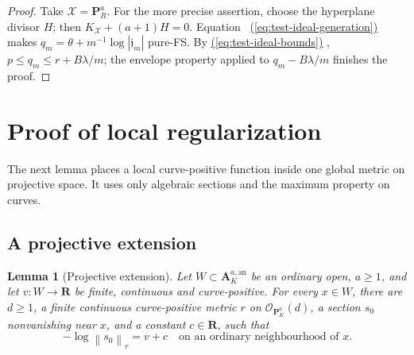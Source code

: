 \documentclass[11pt]{amsart}
\newtheorem{lemma}[theorem]{Lemma}
\theoremstyle{definition}
\theoremstyle{remark}
\numberwithin{equation}{section}
\newcommand{\an}{\mathrm{an}}
\newcommand{\PP}{\mathbf P}
\newcommand{\Aff}{\mathbf A}
\newcommand{\OO}{\mathcal O}
\newcommand{\cX}{\mathscr X}
\newcommand{\norm}[1]{\left\lVert#1\right\rVert}
\renewcommand{\eqref}[1]{%
 \begingroup\hypersetup{linkcolor=equationviolet}%
 \hyperref[#1]{\textup{(\ref*{#1})}}%
 \endgroup}
\begin{document}
\begin{proof}
Take \(\cX=\PP^a_R\).
For the more precise assertion, choose the hyperplane divisor \(H\);
then \(K_{\cX}+(a+1)H=0\).
Equation~\eqref{eq:test-ideal-generation} makes
\(q_m=\theta+m^{-1}\log|\mathfrak j_m|\) pure-FS.
By \eqref{eq:test-ideal-bounds}, \(p\le q_m\le r+B\lambda/m\);
the envelope property applied to \(q_m-B\lambda/m\) finishes the proof.
\end{proof}

\section{Proof of local regularization}\label{sec:local-proof}
The next lemma places a local curve-positive function inside one
global metric on projective space. It uses only algebraic sections
and the maximum property on curves.

\subsection{A projective extension}\label{subsec:projective-extension}

\begin{lemma}[Projective extension]\label{lem:projective-extension}
Let \(W\subset\Aff_K^{a,\an}\) be an ordinary open, \(a\ge1\),
and let \(v:W\to\mathbf R\) be finite, continuous and curve-positive.
For every \(x\in W\), there are \(d\ge1\), a finite continuous
curve-positive metric \(r\) on \(\OO_{\PP^a_K}(d)\), a section \(s_0\)
nonvanishing near \(x\), and a constant \(c\in\mathbf R\), such that
\[
 -\log\norm{s_0}_r=v+c
 \quad\text{on an ordinary neighbourhood of }x.
\]
\end{lemma}
\end{document}
